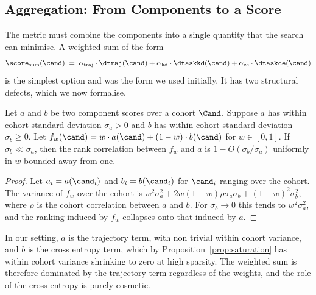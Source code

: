 \subsection{Aggregation: From Components to a Score}

The metric must combine the components into a single quantity that the search can minimise. A weighted sum of the form
\begin{equation}
\score_{\mathrm{sum}}(\cand) \;=\; \alpha_\mathrm{traj} \cdot \dtraj(\cand) + \alpha_{\mathrm{kd}} \cdot \dtaskkd(\cand) + \alpha_{\mathrm{ce}} \cdot \dtaskce(\cand)
\label{eq:weighted_sum}
\end{equation}
is the simplest option and was the form we used initially. It has two structural defects, which we now formalise.

\begin{proposition}
\label{prop:swamp}
Let $a$ and $b$ be two component scores over a cohort $\Cand$. Suppose $a$ has within cohort standard deviation $\sigma_a > 0$ and $b$ has within cohort standard deviation $\sigma_b \ge 0$. Let $f_w(\cand) = w \cdot a(\cand) + (1 - w) \cdot b(\cand)$ for $w \in [0, 1]$. If $\sigma_b \ll \sigma_a$, then the rank correlation between $f_w$ and $a$ is $1 - O(\sigma_b / \sigma_a)$ uniformly in $w$ bounded away from one.
\end{proposition}
\begin{proof}
Let $a_i = a(\cand_i)$ and $b_i = b(\cand_i)$ for $\cand_i$ ranging over the cohort. The variance of $f_w$ over the cohort is $w^2 \sigma_a^2 + 2 w (1-w) \rho \sigma_a \sigma_b + (1-w)^2 \sigma_b^2$, where $\rho$ is the cohort correlation between $a$ and $b$. For $\sigma_b \to 0$ this tends to $w^2 \sigma_a^2$, and the ranking induced by $f_w$ collapses onto that induced by $a$.
\end{proof}

In our setting, $a$ is the trajectory term, with non trivial within cohort variance, and $b$ is the cross entropy term, which by Proposition~\ref{prop:saturation} has within cohort variance shrinking to zero at high sparsity. The weighted sum is therefore dominated by the trajectory term regardless of the weights, and the role of the cross entropy is purely cosmetic.

